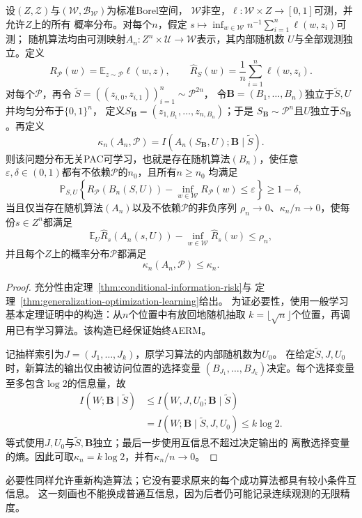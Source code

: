 \begin{theorem}[条件互信息稳定性与可学习性]
\label{thm:conditional-information-learning}
设$(Z,\mathcal Z)$与$(\mathcal W,\mathcal B_{\mathcal W})$为标准Borel空间，
$\mathcal W$非空，$\ell:\mathcal W\times Z\to[0,1]$可测，并允许$Z$上的所有
概率分布。对每个$n$，假定
$s\mapsto\inf_{w\in\mathcal W}n^{-1}\sum_{i=1}^n\ell(w,z_i)$可测；
随机算法均由可测映射$A_n:Z^n\times\mathcal U\to\mathcal W$表示，其内部随机数
$U$与全部观测独立。定义
\[
 R_{\mathcal P}(w)=\mathbb E_{z\sim\mathcal P}\ell(w,z),
 \qquad
 \hat R_S(w)=\frac1n\sum_{i=1}^n\ell(w,z_i).
\]
对每个$\mathcal P$，再令
$\tilde S=((z_{i,0},z_{i,1}))_{i=1}^n\sim\mathcal P^{2n}$，
令$\bm B=(B_1,\ldots,B_n)$独立于$\tilde S,U$并均匀分布于$\{0,1\}^n$，
定义$S_{\bm B}=(z_{1,B_1},\ldots,z_{n,B_n})$；于是
$S_{\bm B}\sim\mathcal P^n$且$U$独立于$S_{\bm B}$。再定义
\[
 \kappa_n(A_n,\mathcal P)
 =I(A_n(S_{\bm B},U);\bm B\mid\tilde S).
\]
则该问题分布无关PAC可学习，也就是存在随机算法$(B_n)$，使任意
$\varepsilon,\delta\in(0,1)$都有不依赖$\mathcal P$的$n_0$，且所有$n\geq n_0$
均满足
\[
 \mathbb P_{S,U}\!\left\{
 R_{\mathcal P}(B_n(S,U))-\inf_{w\in\mathcal W}R_{\mathcal P}(w)
 \leq\varepsilon\right\}\geq1-\delta,
\]
当且仅当存在随机算法$(A_n)$以及不依赖$\mathcal P$的非负序列
$\rho_n\to0$、$\kappa_n/n\to0$，使每份$s\in Z^n$都满足
\[
 \mathbb E_U\hat R_s(A_n(s,U))
 -\inf_{w\in\mathcal W}\hat R_s(w)\leq\rho_n,
\]
并且每个$Z$上的概率分布$\mathcal P$都满足
\[
 \kappa_n(A_n,\mathcal P)\leq\kappa_n.
\]
\end{theorem}
\begin{proof}
充分性由定理~\ref{thm:conditional-information-risk}与
定理~\ref{thm:generalization-optimization-learning}给出。
为证必要性，使用一般学习基本定理证明中的构造：从$n$个位置中有放回地随机抽取
$k=\lfloor\sqrt n\rfloor$个位置，再调用已有学习算法。该构造已经保证始终AERM。

记抽样索引为$J=(J_1,\ldots,J_k)$，原学习算法的内部随机数为$U_0$。
在给定$\tilde S,J,U_0$时，新算法的输出仅由被访问位置的选择变量
$(B_{J_1},\ldots,B_{J_k})$决定。每个选择变量至多包含$\log2$的信息量，故
\begin{align*}
 I(W;\bm B\mid\tilde S)
 &\leq I(W,J,U_0;\bm B\mid\tilde S)\\
 &=I(W;\bm B\mid\tilde S,J,U_0)
 \leq k\log2.
\end{align*}
等式使用$J,U_0$与$\tilde S,\bm B$独立；最后一步使用互信息不超过决定输出的
离散选择变量的熵。因此可取$\kappa_n=k\log2$，并有$\kappa_n/n\to0$。
\end{proof}

必要性同样允许重新构造算法；它没有要求原来的每个成功算法都具有较小条件互信息。
这一刻画也不能换成普通互信息，因为后者仍可能记录连续观测的无限精度。

